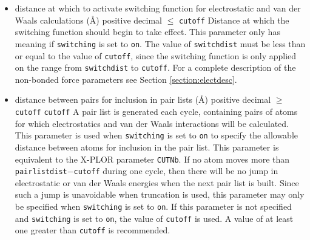 \begin{itemize}

\item
{}
{distance at which to activate switching function 
for electrostatic and van der Waals calculations (\AA)}
{positive decimal $\leq$ {\tt cutoff}}
{Distance at which the switching function
should begin to take effect.  
This parameter only has meaning if {\tt switching} is 
set to {\tt on}.  
The value of {\tt switchdist} must be less than
or equal to the value of {\tt cutoff}, since the switching function
is only applied on the range from {\tt switchdist} to {\tt cutoff}.  
For a complete description of the non-bonded force parameters see
Section \ref{section:electdesc}.}

\item
{}
{distance between pairs for inclusion in pair lists (\AA)}
{positive decimal $\geq$ {\tt cutoff}}
{{\tt cutoff}}
{
A pair list is generated each cycle, 
containing pairs of atoms for which 
electrostatics and van der Waals interactions will be calculated.
This parameter is used when {\tt switching} is set to {\tt on} to
specify the allowable distance between atoms for inclusion in the
pair list.  
This parameter is equivalent to the X-PLOR parameter {\tt CUTNb}.
If no atom moves more than {\tt pairlistdist}$-${\tt cutoff} during
one cycle, then there will be no jump in electrostatic or van der
Waals energies when the next pair list is built.  Since such a jump
is unavoidable when truncation is used, this parameter may only
be specified when {\tt switching} is set to {\tt on}.  If this
parameter is not specified and {\tt switching} is set to {\tt on},
the value of {\tt cutoff} is used.  
A value of at least one greater than {\tt cutoff} is recommended.  
}


\end{itemize}
